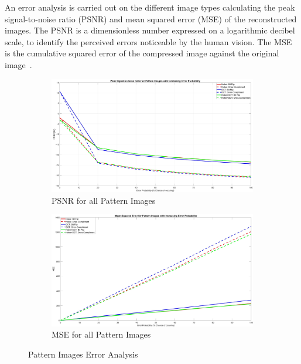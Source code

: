 \documentclass[landscape,a0paper,fontscale=0.5]{baposter} %
\begin{document}
\begin{poster}
{An error analysis is carried out on the different image types calculating the peak signal-to-noise ratio (PSNR) and mean squared error (MSE) of the reconstructed images. The PSNR is a dimensionless number expressed on a logarithmic decibel scale, to identify the perceived errors noticeable by the human vision. The MSE is the cumulative squared error of the compressed image against the original image~\cite{Error}.
\vspace{-1em}
\begin{figure}[H]
\centering
	\begin{subfigure}{0.4\textwidth} %
		\includegraphics[scale=0.09]{PSNRPattern}
		\caption{PSNR for all Pattern Images} %
	\end{subfigure}
	\vspace{1em} %
	\begin{subfigure}{0.4\textwidth} %
		\includegraphics[scale=0.09]{MSEPattern}
		\caption{MSE for all Pattern Images} %
	\end{subfigure}
	\vspace{-2em}
	\caption{Pattern Images Error Analysis}
	\label{fig: Pattern Error} %
\end{figure}


}
\end{poster}
\end{document}
